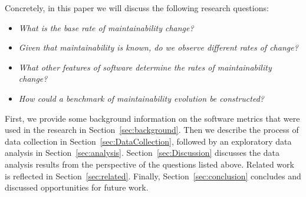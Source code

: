Concretely, in this paper we will discuss the following research questions:
\begin{itemize}
\item \textit{What is the base rate of maintainability change?}
\item \textit{Given that maintainability is known, do we observe different rates of change?}
\item \textit{What other features of software determine the rates of maintainability change?}
\item \textit{How could a benchmark of maintainability evolution be constructed?}
\end{itemize}

First, we provide some background information on the software metrics that were used in the research in Section~\ref{sec:background}. Then we describe the process of data collection in Section~\ref{sec:DataCollection}, followed by an exploratory data analysis in Section~\ref{sec:analysis}. Section~\ref{sec:Discussion} discusses the data analysis results from the perspective of the questions listed above. Related work is reflected in Section~\ref{sec:related}. Finally, Section~\ref{sec:conclusion} concludes and discussed opportunities for future work.

